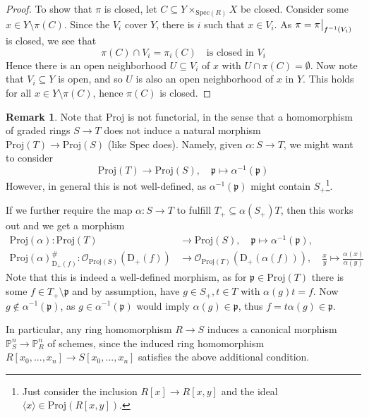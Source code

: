 \documentclass{scrartcl}
\newcommand{\D}[1]{\mathrm{D}_+(#1)}
\renewcommand{\P}{\mathbb{P}}
\newcommand{\p}{\mathfrak{p}}
\newcommand{\Spec}{\mathrm{Spec}}
\newcommand{\Proj}{\mathrm{Proj}}
\renewcommand{\O}{\mathcal{O}}
\newcommand\restr[2]{{
    \left.\kern-\nulldelimiterspace
    #1
    \vphantom{\big|}
    \right|_{#2}
}}
\theoremstyle{definition}
\newtheorem{remark}[subsection]{Remark}
\begin{document}
\begin{proof}
    To show that $\pi$ is closed, let $C \subseteq Y \times_{\Spec(R)} X$ be closed.
    Consider some $x \in Y \setminus \pi(C)$.
    Since the $V_i$ cover $Y$, there is $i$ such that $x \in V_i$.
    As $\pi = \restr{\pi}{f^{-1}(V_i)}$ is closed, we see that
    \begin{equation*}
        \pi(C) \cap V_i = \pi_i(C) \quad \text{is closed in $V_i$}
    \end{equation*}
    Hence there is an open neighborhood $U \subseteq V_i$ of $x$ with $U \cap \pi(C) = \emptyset$.
    Now note that $V_i \subseteq Y$ is open, and so $U$ is also an open neighborhood of $x$ in $Y$.
    This holds for all $x \in Y \setminus \pi(C)$, hence $\pi(C)$ is closed.
\end{proof}
\begin{remark}
    \label{prop:functoriality_proj}
    Note that $\Proj$ is not functorial, in the sense that a homomorphism of graded rings $S \to T$ does not induce a natural morphism $\Proj(T) \to \Proj(S)$ (like $\Spec$ does).
    Namely, given $\alpha: S \to T$, we might want to consider
    \begin{equation*}
        \Proj(T) \to \Proj(S), \quad \p \mapsto \alpha^{-1}(\p)
    \end{equation*}
    However, in general this is not well-defined, as $\alpha^{-1}(\p)$ might contain $S_+$\footnote{Just consider the inclusion $R[x] \to R[x, y]$ and the ideal $\langle x \rangle \in \Proj(R[x, y])$.}.

    If we further require the map $\alpha: S \to T$ to fulfill $T_+ \subseteq \alpha(S_+)T$, then this works out and we get a morphism
    \begin{align*}
        \Proj(\alpha): \Proj(T) &\to \Proj(S), \quad \p \mapsto \alpha^{-1}(\p), \\
        \Proj(\alpha)^\#_{\D{f}}: \O_{\Proj(S)}(\D{f}) &\to \O_{\Proj(T)}(\D{\alpha(f)}), \quad \frac x y \mapsto \frac {\alpha(x)} {\alpha(y)}
    \end{align*}
    Note that this is indeed a well-defined morphism, as for $\p \in \Proj(T)$ there is some $f \in T_+ \setminus \p$ and by assumption, have $g \in S_+, t \in T$ with $\alpha(g)t = f$.
    Now $g \notin \alpha^{-1}(\p)$, as $g \in \alpha^{-1}(\p)$ would imply $\alpha(g) \in \p$, thus $f = t\alpha(g) \in \p$.

    In particular, any ring homomorphism $R \to S$ induces a canonical morphism $\P_S^n \to \P_R^n$ of schemes, since the induced ring homomorphism $R[x_0, ..., x_n] \to S[x_0, ..., x_n]$ satisfies the above additional condition.
\end{remark}
\end{document}
